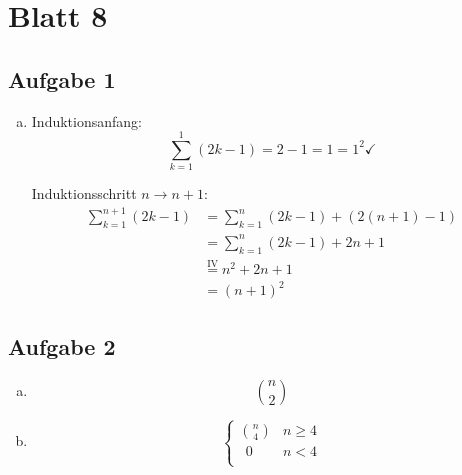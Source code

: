 \section*{Blatt 8}
%

\subsection*{Aufgabe 1}
\begin{enumerate}[a)]
\item
Induktionsanfang: \[ \sum_{k=1}^1 (2k-1) = 2-1 = 1 = 1^2 \checkmark \]


Induktionsschritt $n \to n+1$:
\begin{align*}
\sum_{k=1}^{n+1} (2k-1) &= \sum_{k=1}^n (2k-1) + (2(n+1) -1) \\
                        &= \sum_{k=1}^n (2k-1) + 2 n +1 \\
                        &\stackrel{\text{IV}}{=} n^2 + 2n + 1\\
                        &= (n+1)^2
\end{align*}

\end{enumerate}

\subsection*{Aufgabe 2}
\begin{enumerate}[a)]
\item \[\binom{n}{2}\]
\item \[\begin{cases} \binom{n}{4} & n\geq 4 \\
              \; \, 0 & n < 4  \\
              \end{cases} \]

\end{enumerate}
